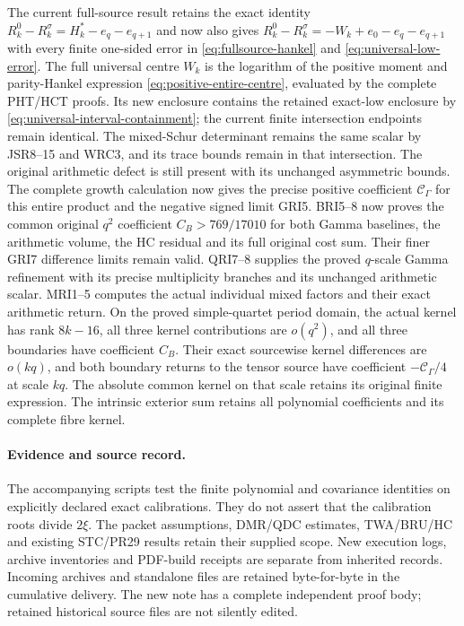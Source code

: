 \documentclass[11pt,a4paper]{article}
\begin{document}
The current full-source result retains the exact identity
$R_k^0-R_k^\sigma=H_k^*-e_q-e_{q+1}$ and now also gives
$R_k^0-R_k^\sigma=-W_k+e_0-e_q-e_{q+1}$ with every finite
one-sided error in \eqref{eq:fullsource-hankel} and
\eqref{eq:universal-low-error}. The full universal centre
$W_k$ is the logarithm of the positive moment and parity-Hankel expression
\eqref{eq:positive-entire-centre}, evaluated by the complete
PHT/HCT proofs. Its new enclosure contains the retained
exact-low enclosure by \eqref{eq:universal-interval-containment};
the current finite intersection endpoints remain identical.
The mixed-Schur determinant remains the same scalar by
JSR8--15 and WRC3, and its trace bounds remain in that intersection.
The original arithmetic defect is still present with its
unchanged asymmetric bounds. The complete growth calculation now
gives the precise positive coefficient $\mathcal C_\Gamma$ for
this entire product and the negative signed limit GRI5.
BRI5--8 now proves the common original $q^2$ coefficient
$C_B>769/17010$ for both Gamma baselines, the arithmetic volume,
the HC residual and its full original cost sum. Their finer
GRI7 difference limits remain valid. QRI7--8 supplies the proved
$q$-scale Gamma refinement with its precise multiplicity branches
and its unchanged arithmetic scalar. MRI1--5 computes the actual
individual mixed factors and their exact arithmetic return. On
the proved simple-quartet period domain, the actual kernel has
rank $8k-16$, all three kernel contributions are $o(q^2)$,
and all three boundaries have coefficient $C_B$. Their exact
sourcewise kernel differences are $o(kq)$, and both boundary
returns to the tensor source have coefficient $-\mathcal C_\Gamma/4$
at scale $kq$. The absolute common kernel on that scale retains
its original finite expression. The intrinsic exterior sum retains
all polynomial coefficients and its complete fibre kernel.

\paragraph{Evidence and source record.}
The accompanying scripts test the finite polynomial and covariance identities on explicitly declared exact calibrations. They do not assert that the calibration roots divide $2\xi$. The packet assumptions, DMR/QDC estimates, TWA/BRU/HC and existing STC/PR29 results retain their supplied scope. New execution logs, archive inventories and PDF-build receipts are separate from inherited records. Incoming archives and standalone files are retained byte-for-byte in the cumulative delivery. The new note has a complete independent proof body; retained historical source files are not silently edited.
\end{document}
